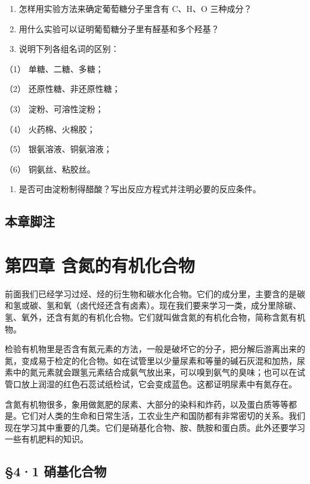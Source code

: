 \begin{enumerate}[start=9]
\item
  怎样用实验方法来确定葡萄糖分子里含有 C、H、O 三种成分？
\item
  用什么实验可以证明葡萄糖分子里有醛基和多个羟基？
\item
  说明下列各组名词的区别：
\end{enumerate}

（1） 单糖、二糖、多糖；

（2） 还原性糖、非还原性糖；

（3） 淀粉、可溶性淀粉；

（4） 火药棉、火棉胶；

（5） 银氨溶液、铜氨溶液；

（6） 铜氨丝、粘胶丝。

\begin{enumerate}[start=12]
\item
  是否可由淀粉制得醋酸？写出反应方程式并注明必要的反应条件。
\end{enumerate}

\section{本章脚注}

\chapter{第四章 含氮的有机化合物}

前面我们已经学习过烃、烃的衍生物和碳水化合物。它们的成分里，主要含的是碳和氢或碳、氢和氧（卤代烃还含有卤素）。现在我们要来学习一类，成分里除碳、氢、氧外，还含有氮的有机化合物。它们就叫做含氮的有机化合物，简称含氮有机物。

检验有机物里是否含有氮元素的方法，一般是破坏它的分子，把分解后游离出来的氮，变成易于检定的化合物。如在试管里以少量尿素和等量的碱石灰混和加热，尿素中的氮元素就会跟氢元素结合成氨气放出来，可以嗅到氨气的臭味；也可以在试管口放上润湿的红色石蕊试纸检试，它会变成蓝色。这都证明尿素中有氮存在。

含氮有机物很多，象用做氮肥的尿素、大部分的染料和炸药，以及蛋白质等等都是。它们对人类的生命和日常生活，工农业生产和国防都有非常密切的关系。我们现在学习其中重要的几类。它们是硝基化合物、胺、酰胺和蛋白质。此外还要学习一些有机肥料的知识。

\section{§4·1 硝基化合物}

